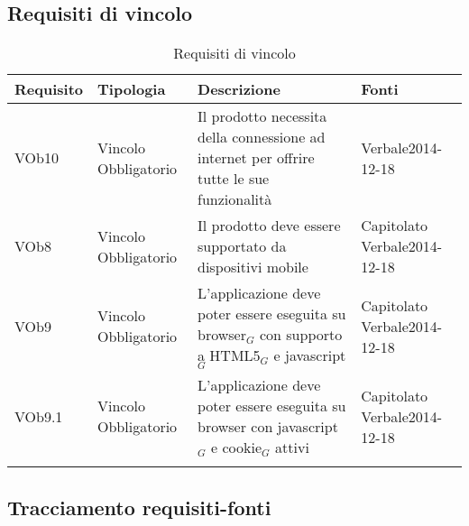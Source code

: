 \newpage
\subsection{ Requisiti di vincolo}
	
\begin{longtable}{|l|p{2.5cm}|p{5cm}|p{3.5cm}|}
\hline
\textbf{Requisito} & \textbf{Tipologia} & \textbf{Descrizione} & \textbf{Fonti} \\
\hline
VOb10 & Vincolo \linebreak Obbligatorio & Il prodotto necessita della connessione ad internet per offrire tutte le sue funzionalità & Verbale2014-12-18 \linebreak \\
\hline
VOb8 & Vincolo \linebreak Obbligatorio & Il prodotto deve essere supportato da dispositivi mobile & Capitolato \linebreak Verbale2014-12-18 \linebreak \\
\hline
VOb9 & Vincolo \linebreak Obbligatorio & L'applicazione deve poter essere eseguita su browser$_G$ con supporto a HTML5$_G$ e javascript$_G$ & Capitolato \linebreak Verbale2014-12-18 \linebreak \\
\hline
VOb9.1 & Vincolo \linebreak Obbligatorio & L'applicazione deve poter essere eseguita su browser con javascript$_G$ e cookie$_G$ attivi & Capitolato \linebreak  Verbale2014-12-18 \linebreak  \\
\hline
\caption{Requisiti di vincolo}
\end{longtable}
\newpage
\subsection{ Tracciamento requisiti-fonti}
	
